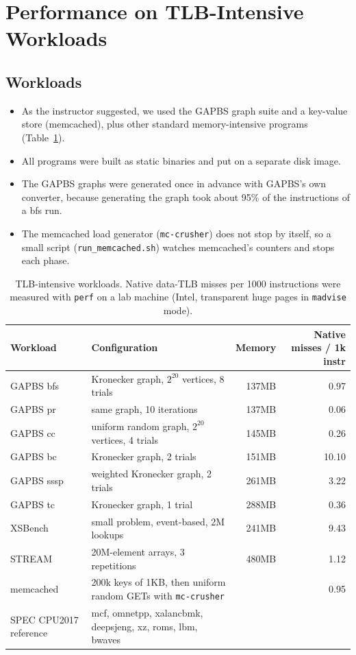 \section{Performance on TLB-Intensive Workloads}
\label{sec:perf}

\subsection{Workloads}
\begin{itemize}
    \item As the instructor suggested, we used the GAPBS graph suite and a key-value store (memcached), plus other standard memory-intensive programs (Table~\ref{tab:workloads}).
    \item All programs were built as static binaries and put on a separate disk image.
    \item The GAPBS graphs were generated once in advance with GAPBS's own converter, because generating the graph took about 95\% of the instructions of a bfs run.
    \item The memcached load generator (\texttt{mc-crusher}) does not stop by itself, so a small script (\texttt{run\_memcached.sh}) watches memcached's counters and stops each phase.
\end{itemize}

\begin{table}[H]
\centering
\small
\caption{TLB-intensive workloads. Native data-TLB misses per 1000 instructions were measured with \texttt{perf} on a lab machine (Intel, transparent huge pages in \texttt{madvise} mode).}
\label{tab:workloads}
\begin{tabularx}{\textwidth}{l X r r}
\toprule
\textbf{Workload} & \textbf{Configuration} & \textbf{Memory} & \textbf{Native misses / 1k instr} \\
\midrule
GAPBS bfs~\cite{beamer2015gap} & Kronecker graph, $2^{20}$ vertices, 8 trials & 137MB & 0.97 \\
GAPBS pr & same graph, 10 iterations & 137MB & 0.06 \\
GAPBS cc & uniform random graph, $2^{20}$ vertices, 4 trials & 145MB & 0.26 \\
GAPBS bc & Kronecker graph, 2 trials & 151MB & 10.10 \\
GAPBS sssp & weighted Kronecker graph, 2 trials & 261MB & 3.22 \\
GAPBS tc & Kronecker graph, 1 trial & 288MB & 0.36 \\
XSBench~\cite{tramm2014xsbench} & small problem, event-based, 2M lookups & 241MB & 9.43 \\
STREAM~\cite{mccalpin1995stream} & 20M-element arrays, 3 repetitions & 480MB & 1.12 \\
memcached~\cite{memcached} & 200k keys of 1KB, then uniform random GETs with \texttt{mc-crusher} & & 0.95 \\
SPEC CPU2017 reference & mcf, omnetpp, xalancbmk, deepsjeng, xz, roms, lbm, bwaves & & \\
\bottomrule
\end{tabularx}
\end{table}

